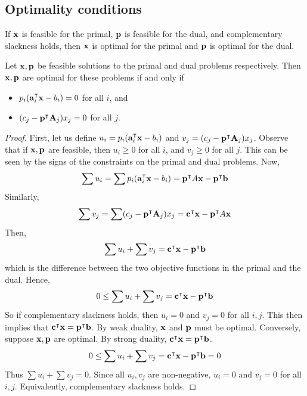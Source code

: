 \subsection{Optimality conditions}
If \( \vb x \) is feasible for the primal, \( \vb p \) is feasible for the dual, and complementary slackness holds, then \( \vb x \) is optimal for the primal and \( \vb p \) is optimal for the dual.
\begin{theorem}
	Let \( \vb x, \vb p \) be feasible solutions to the primal and dual problems respectively.
	Then \( \vb x, \vb p \) are optimal for these problems if and only if
	\begin{itemize}
		\item \( p_i (\vb a_i^\intercal \vb x - b_i) = 0 \) for all \( i \), and
		\item  \( (c_j - \vb p^\intercal \vb A_j) x_j = 0 \) for all \( j \).
	\end{itemize}
\end{theorem}
\begin{proof}
	First, let us define \( u_i = p_i (\vb a_i^\intercal \vb x - b_i ) \) and \( v_j = (c_j - \vb p^\intercal \vb A_j) x_j \).
	Observe that if \( \vb x, \vb p \) are feasible, then \( u_i \geq 0 \) for all \( i \), and \( v_j \geq 0 \) for all \( j \).
	This can be seen by the signs of the constraints on the primal and dual problems.
	Now,
	\[
		\sum u_i = \sum p_i (\vb a_i^\intercal \vb x - b_i ) = \vb p^\intercal A \vb x - \vb p^\intercal \vb b
	\]
	Similarly,
	\[
		\sum v_j = \sum (c_j - \vb p^\intercal \vb A_j) x_j = \vb c^\intercal \vb x - \vb p^\intercal A \vb x
	\]
	Then,
	\[
		\sum u_i + \sum v_j = \vb c^\intercal \vb x - \vb p^\intercal \vb b
	\]
	which is the difference between the two objective functions in the primal and the dual.
	Hence,
	\[
		0 \leq \sum u_i + \sum v_j = \vb c^\intercal \vb x - \vb p^\intercal \vb b
	\]
	So if complementary slackness holds, then \( u_i = 0 \) and \( v_j = 0 \) for all \( i, j \).
	This then implies that \( \vb c^\intercal \vb x = \vb p^\intercal \vb b \).
	By weak duality, \( \vb x \) and \( \vb p \) must be optimal.
	Conversely, suppose \( \vb x, \vb p \) are optimal.
	By strong duality, \( \vb c^\intercal \vb x = \vb p^\intercal \vb b \).
	\[
		0 \leq \sum u_i + \sum v_j = \vb c^\intercal \vb x - \vb p^\intercal \vb b = 0
	\]
	Thus \( \sum u_i + \sum v_j = 0 \).
	Since all \( u_i, v_j \) are non-negative, \( u_i = 0 \) and \( v_j = 0 \) for all \( i, j \).
	Equivalently, complementary slackness holds.
\end{proof}


